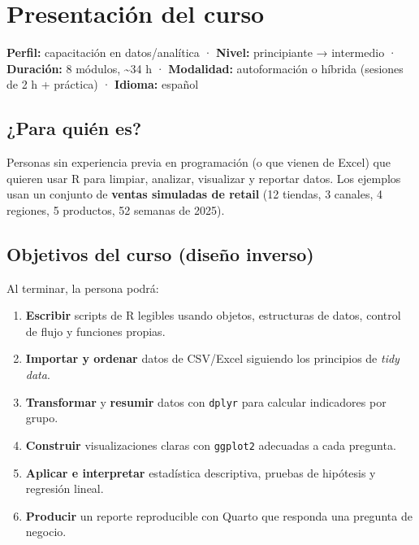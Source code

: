 \chapter*{Presentación del curso}

\textbf{Perfil:} capacitación en datos/analítica · \textbf{Nivel:}
principiante → intermedio · \textbf{Duración:} 8 módulos,
\textasciitilde34 h · \textbf{Modalidad:} autoformación o híbrida
(sesiones de 2 h + práctica) · \textbf{Idioma:} español

\section*{¿Para quién es?}

Personas sin experiencia previa en programación (o que vienen de Excel)
que quieren usar R para limpiar, analizar, visualizar y reportar datos.
Los ejemplos usan un conjunto de \textbf{ventas simuladas de retail} (12
tiendas, 3 canales, 4 regiones, 5 productos, 52 semanas de 2025).

\section*{Objetivos del curso (diseño inverso)}

Al terminar, la persona podrá:

\begin{enumerate}
\def\labelenumi{\arabic{enumi}.}
\tightlist
\item
  \textbf{Escribir} scripts de R legibles usando objetos, estructuras de
  datos, control de flujo y funciones propias.
\item
  \textbf{Importar y ordenar} datos de CSV/Excel siguiendo los
  principios de \emph{tidy data}.
\item
  \textbf{Transformar} y \textbf{resumir} datos con
  \passthrough{\lstinline!dplyr!} para calcular indicadores por grupo.
\item
  \textbf{Construir} visualizaciones claras con
  \passthrough{\lstinline!ggplot2!} adecuadas a cada pregunta.
\item
  \textbf{Aplicar e interpretar} estadística descriptiva, pruebas de
  hipótesis y regresión lineal.
\item
  \textbf{Producir} un reporte reproducible con Quarto que responda una
  pregunta de negocio.
\end{enumerate}

